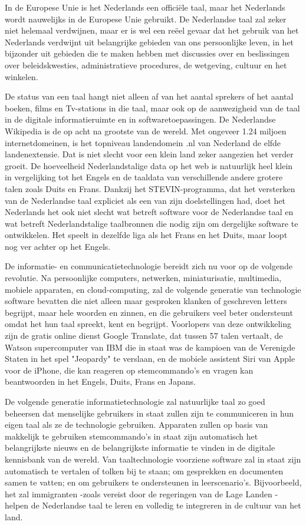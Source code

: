 \begin{multicols}{2}
In de Europese Unie is het Nederlands een offici{\"e}le taal, maar het Nederlands wordt nauwelijks in de Europese Unie gebruikt. De Nederlandse taal zal zeker niet helemaal verdwijnen, maar er is wel een re{\"e}el gevaar dat het gebruik van het Nederlands verdwijnt uit belangrijke gebieden van ons persoonlijke leven, in het bijzonder uit gebieden die te maken hebben met discussies over en beslissingen over beleidskwesties, administratieve procedures, de wetgeving, cultuur en het winkelen.

De status van een taal hangt niet alleen af van het aantal sprekers of het aantal boeken, films en Tv-stations in die taal, maar ook op de aanwezigheid van de taal in de digitale informatieruimte en in softwaretoepassingen. De Nederlandse Wikipedia is de op acht na grootste van de wereld. Met ongeveer 1.24 miljoen internetdomeinen, is het topniveau landendomein {\textit .nl} van Nederland de elfde landenextensie.  Dat is niet slecht voor een klein land zeker aangezien het verder groeit. De hoeveelheid Nederlandstalige data op het web is natuurlijk heel klein in vergelijking tot het Engels en de taaldata van verschillende andere grotere talen zoals Duits en Frans. Dankzij het STEVIN-programma, dat het versterken van de Nederlandse taal expliciet als een van zijn doelstellingen had, doet het Nederlands het ook niet slecht wat betreft software voor de Nederlandse taal en wat betreft Nederlandstalige taalbronnen die nodig zijn om dergelijke software te ontwikkelen.
Het speelt in dezelfde liga als het Frans en het Duits, maar loopt nog ver achter op het Engels.

De informatie- en communicatietechnologie bereidt zich nu voor op de volgende revolutie. Na persoonlijke computers, netwerken, miniaturisatie, multimedia, mobiele apparaten, en cloud-computing, zal de volgende generatie van technologie software bevatten die niet alleen maar gesproken klanken of geschreven letters begrijpt, maar hele woorden en zinnen, en die gebruikers veel beter ondersteunt omdat het hun taal spreekt, kent en begrijpt. Voorlopers van deze ontwikkeling zijn de gratis online  dienst Google Translate, dat tussen 57 talen vertaalt, de Watson supercomputer van IBM die in staat was de kampioen van de Verenigde Staten in het spel "Jeopardy" te verslaan, en de mobiele assistent Siri  van Apple voor de iPhone, die kan reageren op stemcommando's en vragen kan beantwoorden in het Engels, Duits, Frans en Japans.

De volgende generatie informatietechnologie zal natuurlijke taal zo goed beheersen dat menselijke gebruikers in staat zullen zijn te communiceren in hun eigen taal als ze de technologie gebruiken. Apparaten zullen op basis van makkelijk te gebruiken stemcommando's  in staat zijn automatisch het belangrijkste nieuws en de belangrijkste informatie te vinden in de digitale kennisbank van de wereld. Van taaltechnologie voorziene software zal in staat zijn automatisch te vertalen of tolken bij te staan; om gesprekken en documenten samen te vatten; en om gebruikers te ondersteunen in leerscenario's. Bijvoorbeeld, het zal immigranten -zoals vereist door de regeringen van de Lage Landen - helpen de Nederlandse taal te leren en volledig te integreren in de cultuur van het land.


\end{multicols}
